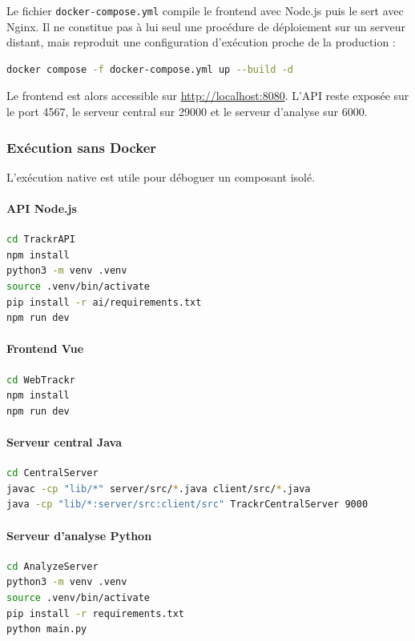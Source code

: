\documentclass[11pt,a4paper]{article}
\newcommand{\code}[1]{\nolinkurl{#1}}
\begin{document}
Le fichier \code{docker-compose.yml} compile le frontend avec Node.js puis le sert avec Nginx. Il ne constitue pas à lui seul une procédure de déploiement sur un serveur distant, mais reproduit une configuration d'exécution proche de la production :

\begin{lstlisting}[language=bash]
docker compose -f docker-compose.yml up --build -d
\end{lstlisting}

Le frontend est alors accessible sur \url{http://localhost:8080}. L'API reste exposée sur le port 4567, le serveur central sur 29000 et le serveur d'analyse sur 6000.

\subsubsection{Exécution sans Docker}

L'exécution native est utile pour déboguer un composant isolé.

\paragraph{API Node.js}
\begin{lstlisting}[language=bash]
cd TrackrAPI
npm install
python3 -m venv .venv
source .venv/bin/activate
pip install -r ai/requirements.txt
npm run dev
\end{lstlisting}

\paragraph{Frontend Vue}
\begin{lstlisting}[language=bash]
cd WebTrackr
npm install
npm run dev
\end{lstlisting}

\paragraph{Serveur central Java}
\begin{lstlisting}[language=bash]
cd CentralServer
javac -cp "lib/*" server/src/*.java client/src/*.java
java -cp "lib/*:server/src:client/src" TrackrCentralServer 9000
\end{lstlisting}

\clearpage

\paragraph{Serveur d'analyse Python}
\begin{lstlisting}[language=bash]
cd AnalyzeServer
python3 -m venv .venv
source .venv/bin/activate
pip install -r requirements.txt
python main.py
\end{lstlisting}
\end{document}
